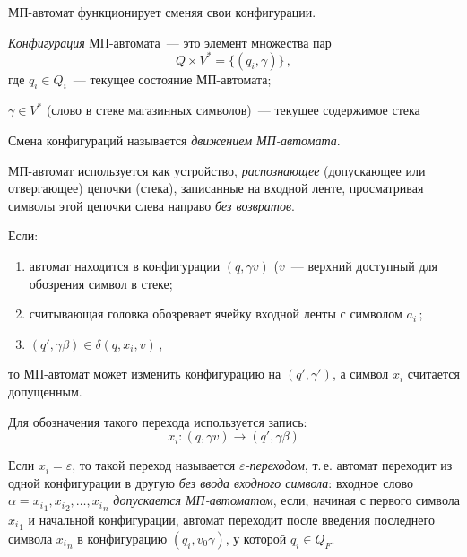 МП-автомат функционирует сменяя свои конфигурации.

\begin{defin}
  \emph{Конфигурация} МП-автомата~--- это элемент множества пар
  \begin{equation*}
    Q \times V^*=\{(q_i,\gamma)\}\,,
  \end{equation*}
  где $q_i \in Q_i$~--- текущее состояние МП-автомата;

  $\gamma \in V^*$ (слово в стеке магазинных символов)~--- текущее
  содержимое стека
\end{defin}

Смена конфигураций называется \emph{движением МП-автомата}.

МП-автомат используется как устройство, \emph{распознающее}
(допускающее или отвергающее) цепочки (стека), записанные на входной
ленте, просматривая символы этой цепочки слева направо \emph{без
  возвратов}.

\noindent Если:
\begin{enumerate}
\item автомат находится в конфигурации $(q,\gamma v)$ ($v$~--- верхний
  доступный для обозрения символ в стеке;
\item считывающая головка обозревает ячейку входной ленты с символом $a_i$\,;
\item $(q',\gamma\beta) \in \delta(q,x_i,v)$\,,
\end{enumerate}
то МП-автомат может изменить конфигурацию на $(q',\gamma')$, а символ
$x_i$ считается допущенным.

Для обозначения такого перехода используется запись:
\begin{equation*}
  x_i\colon (q,\gamma v) \to (q', \gamma\beta)
\end{equation*}

Если $x_i = \varepsilon$, то такой переход называется
\emph{$\varepsilon$-переходом}, т.\,е. автомат переходит из одной
конфигурации в другую \emph{без ввода входного символа}: входное слово
$\alpha = {x_i}_1,{x_i}_2,\ldots,{x_i}_n$ \emph{допускается
  МП-автоматом}, если, начиная с первого символа ${x_i}_1$ и начальной
конфигурации, автомат переходит после введения последнего символа
${x_i}_n$ в конфигурацию $(q_i,v_0\gamma)$, у которой $q_i \in Q_F$.

